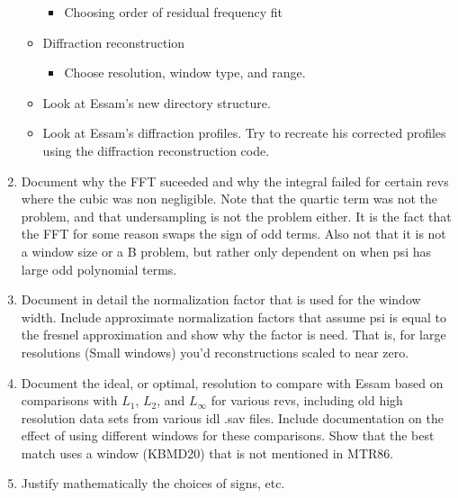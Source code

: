 \documentclass[crop=false,class=article,oneside]{standalone}
\begin{document}
\begin{enumerate}
\begin{itemize}
\begin{itemize}
                    \item Choosing order of residual frequency fit
                \end{itemize}
                \item Diffraction reconstruction
                \begin{itemize}
                    \item Choose resolution, window type, and range.
                \end{itemize}
                \item Look at Essam's new directory structure.
                \item Look at Essam's diffraction profiles. Try to recreate his corrected profiles using the diffraction reconstruction code.
            \end{itemize}
            \item Document why the FFT suceeded and why the
                  integral failed for certain revs where the cubic was
                  non negligible. Note that the quartic term was not
                  the problem, and that undersampling is not the
                  problem either. It is the fact that the FFT for
                  some reason swaps the sign of odd terms. Also not
                  that it is not a window size or a B problem, but
                  rather only dependent on when psi has large odd
                  polynomial terms.
            \item Document in detail the normalization factor that
                  is used for the window width. Include approximate
                  normalization factors that assume psi is equal to
                  the fresnel approximation and show why the factor
                  is need. That is, for large resolutions
                  (Small windows) you'd reconstructions scaled
                  to near zero.
            \item Document the ideal, or optimal, resolution to compare
                  with Essam based on comparisons with $L_{1}$,
                  $L_{2}$, and $L_{\infty}$ for various revs, including
                  old high resolution data sets from various idl .sav
                  files. Include documentation on the effect of using
                  different windows for these comparisons. Show that
                  the best match uses a window (KBMD20) that is not
                  mentioned in MTR86.
            \item Justify mathematically the choices of signs, etc.

\end{enumerate}
\end{document}
